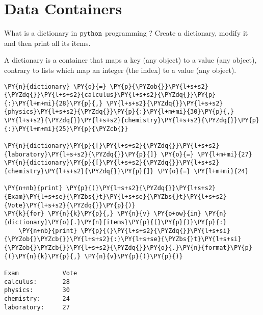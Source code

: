 \chapter{Data Containers}\label{introduction-to-python---lesson-2}

\begin{Exercise}
What is a dictionary in \(\tt{python}\) programming ? Create a dictionary, modify it and then print all its items.
\end{Exercise}

\begin{Answer}
A dictionary is a container that maps a key (any object) to a value (any
object), contrary to lists which map an integer (the index) to a value
(any object).

\begin{codebox}[size=fbox, boxrule=1pt, colback=cellbackground, colframe=cellborder]
\begin{Verbatim}[commandchars=\\\{\}]
\PY{n}{dictionary} \PY{o}{=} \PY{p}{\PYZob{}}\PY{l+s+s2}{\PYZdq{}}\PY{l+s+s2}{calculus}\PY{l+s+s2}{\PYZdq{}}\PY{p}{:}\PY{l+m+mi}{28}\PY{p}{,} \PY{l+s+s2}{\PYZdq{}}\PY{l+s+s2}{physics}\PY{l+s+s2}{\PYZdq{}}\PY{p}{:}\PY{l+m+mi}{30}\PY{p}{,} \PY{l+s+s2}{\PYZdq{}}\PY{l+s+s2}{chemistry}\PY{l+s+s2}{\PYZdq{}}\PY{p}{:}\PY{l+m+mi}{25}\PY{p}{\PYZcb{}}

\PY{n}{dictionary}\PY{p}{[}\PY{l+s+s2}{\PYZdq{}}\PY{l+s+s2}{laboratory}\PY{l+s+s2}{\PYZdq{}}\PY{p}{]} \PY{o}{=} \PY{l+m+mi}{27}
\PY{n}{dictionary}\PY{p}{[}\PY{l+s+s2}{\PYZdq{}}\PY{l+s+s2}{chemistry}\PY{l+s+s2}{\PYZdq{}}\PY{p}{]} \PY{o}{=} \PY{l+m+mi}{24}

\PY{n+nb}{print} \PY{p}{(}\PY{l+s+s2}{\PYZdq{}}\PY{l+s+s2}{Exam}\PY{l+s+se}{\PYZbs{}t}\PY{l+s+se}{\PYZbs{}t}\PY{l+s+s2}{Vote}\PY{l+s+s2}{\PYZdq{}}\PY{p}{)}
\PY{k}{for} \PY{n}{k}\PY{p}{,} \PY{n}{v} \PY{o+ow}{in} \PY{n}{dictionary}\PY{o}{.}\PY{n}{items}\PY{p}{(}\PY{p}{)}\PY{p}{:}
    \PY{n+nb}{print} \PY{p}{(}\PY{l+s+s2}{\PYZdq{}}\PY{l+s+si}{\PYZob{}\PYZcb{}}\PY{l+s+s2}{:}\PY{l+s+se}{\PYZbs{}t}\PY{l+s+si}{\PYZob{}\PYZcb{}}\PY{l+s+s2}{\PYZdq{}}\PY{o}{.}\PY{n}{format}\PY{p}{(}\PY{n}{k}\PY{p}{,} \PY{n}{v}\PY{p}{)}\PY{p}{)}

Exam            Vote
calculus:       28
physics:        30
chemistry:      24
laboratory:     27
\end{Verbatim}
\end{codebox}
\end{Answer}


